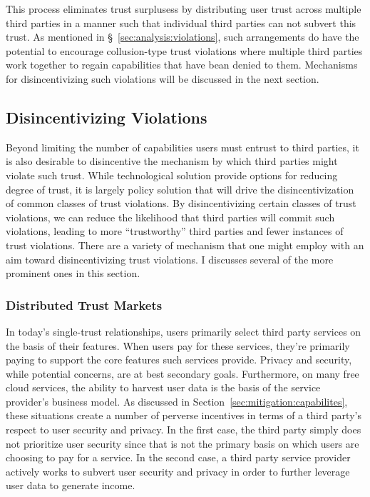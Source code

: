 This process eliminates trust surplusess by distributing user trust
across multiple third parties in a manner such that individual third
parties can not subvert this trust. As mentioned in
\S~\ref{sec:analysis:violations}, such arrangements do have the
potential to encourage collusion-type trust violations where multiple
third parties work together to regain capabilities that have bean
denied to them. Mechanisms for disincentivizing such violations will
be discussed in the next section.

\subsection{Disincentivizing Violations}
\label{sec:mitigation:violations}

Beyond limiting the number of capabilities users must entrust to third
parties, it is also desirable to disincentive the mechanism by which
third parties might violate such trust.  While technological solution
provide options for reducing degree of trust, it is largely policy
solution that will drive the disincentivization of common classes of
trust violations. By disincentivizing certain classes of trust
violations, we can reduce the likelihood that third parties will
commit such violations, leading to more ``trustworthy'' third parties
and fewer instances of trust violations. There are a variety of
mechanism that one might employ with an aim toward disincentivizing
trust violations. I discusses several of the more prominent ones in
this section.

\subsubsection{Distributed Trust Markets}

In today's single-trust relationships, users primarily select third
party services on the basis of their features. When users pay for
these services, they're primarily paying to support the core features
such services provide. Privacy and security, while potential concerns,
are at best secondary goals. Furthermore, on many free cloud services,
the ability to harvest user data is the basis of the service
provider's business model. As discussed in
Section~\ref{sec:mitigation:capabilites}, these situations create a
number of perverse incentives in terms of a third party's respect to
user security and privacy. In the first case, the third party simply
does not prioritize user security since that is not the primary basis
on which users are choosing to pay for a service. In the second case,
a third party service provider actively works to subvert user security
and privacy in order to further leverage user data to generate income.


